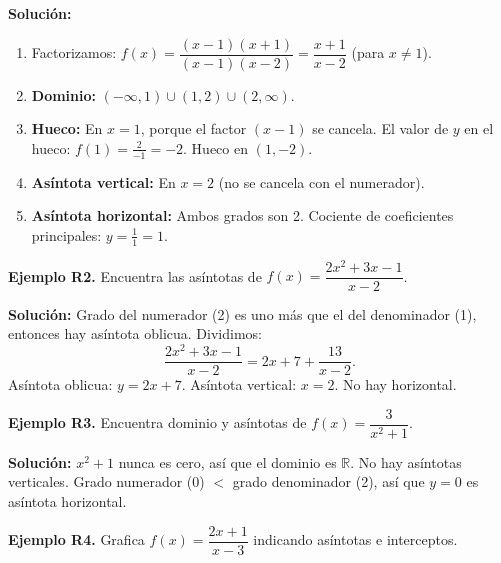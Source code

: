\documentclass[12pt, a4paper]{article}
\begin{document}
\begin{cuadrosolucion}
  \textbf{Solución:}
  \begin{enumerate}
    \item Factorizamos: $f(x) = \dfrac{(x - 1)(x + 1)}{(x - 1)(x - 2)} = \dfrac{x + 1}{x - 2}$ (para $x \neq 1$).
    \item \textbf{Dominio:} $(-\infty, 1) \cup (1, 2) \cup (2, \infty)$.
    \item \textbf{Hueco:} En $x = 1$, porque el factor $(x - 1)$ se cancela. El valor de $y$ en el hueco: $f(1) = \frac{2}{-1} = -2$. Hueco en $(1, -2)$.
    \item \textbf{Asíntota vertical:} En $x = 2$ (no se cancela con el numerador).
    \item \textbf{Asíntota horizontal:} Ambos grados son 2. Cociente de coeficientes principales: $y = \frac{1}{1} = 1$.
  \end{enumerate}
\end{cuadrosolucion}

\textbf{Ejemplo R2.} Encuentra las asíntotas de $f(x) = \dfrac{2x^2 + 3x - 1}{x - 2}$.

\begin{cuadrosolucion}
  \textbf{Solución:} Grado del numerador (2) es uno más que el del denominador (1), entonces hay asíntota oblicua. Dividimos:
  $$\dfrac{2x^2 + 3x - 1}{x - 2} = 2x + 7 + \dfrac{13}{x - 2}.$$
  Asíntota oblicua: $y = 2x + 7$. Asíntota vertical: $x = 2$. No hay horizontal.
\end{cuadrosolucion}

\textbf{Ejemplo R3.} Encuentra dominio y asíntotas de $f(x) = \dfrac{3}{x^2 + 1}$.

\begin{cuadrosolucion}
  \textbf{Solución:} $x^2 + 1$ nunca es cero, así que el dominio es $\mathbb{R}$. No hay asíntotas verticales. Grado numerador (0) $<$ grado denominador (2), así que $y = 0$ es asíntota horizontal.
\end{cuadrosolucion}

\newpage

\textbf{Ejemplo R4.} Grafica $f(x) = \dfrac{2x + 1}{x - 3}$ indicando asíntotas e interceptos.
\end{document}

